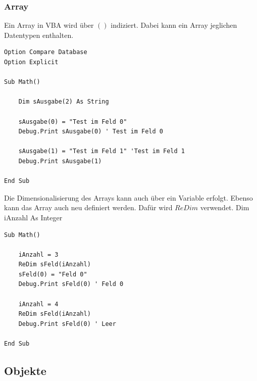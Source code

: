 \subsubsection{Array}
Ein Array in \gls{VBA} wird über $()$ indiziert. Dabei kann ein Array jeglichen Datentypen enthalten.
\begin{lstlisting}[style=VBA]
Option Compare Database
Option Explicit

Sub Math()

	Dim sAusgabe(2) As String
	
	sAusgabe(0) = "Test im Feld 0"
	Debug.Print sAusgabe(0) ' Test im Feld 0
	
	sAusgabe(1) = "Test im Feld 1" 'Test im Feld 1
	Debug.Print sAusgabe(1)
	
End Sub
\end{lstlisting} 
Die Dimensionalisierung des Arrays kann auch über ein Variable erfolgt. Ebenso kann das Array auch neu definiert werden. Dafür wird $ReDim$ verwendet.
Dim iAnzahl As Integer
\begin{lstlisting}[style=VBA]
Sub Math()

	iAnzahl = 3
	ReDim sFeld(iAnzahl)
	sFeld(0) = "Feld 0"
	Debug.Print sFeld(0) ' Feld 0
	
	iAnzahl = 4
	ReDim sFeld(iAnzahl)
	Debug.Print sFeld(0) ' Leer

End Sub
\end{lstlisting} 
\subsection{Objekte}

